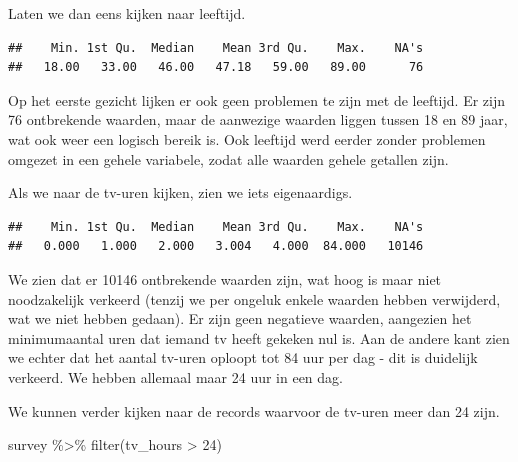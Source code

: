 \documentclass[]{tufte-book}
\newenvironment{Shaded}{}{}
\newcommand{\DecValTok}[1]{\textcolor[rgb]{0.25,0.63,0.44}{#1}}
\newcommand{\FunctionTok}[1]{\textcolor[rgb]{0.02,0.16,0.49}{#1}}
\newcommand{\NormalTok}[1]{#1}
\newcommand{\SpecialCharTok}[1]{\textcolor[rgb]{0.25,0.44,0.63}{#1}}
\begin{document}
Laten we dan eens kijken naar leeftijd.

\begin{Shaded}
\end{Shaded}

\begin{verbatim}
##    Min. 1st Qu.  Median    Mean 3rd Qu.    Max.    NA's 
##   18.00   33.00   46.00   47.18   59.00   89.00      76
\end{verbatim}

Op het eerste gezicht lijken er ook geen problemen te zijn met de leeftijd. Er zijn 76 ontbrekende waarden, maar de aanwezige waarden liggen tussen 18 en 89 jaar, wat ook weer een logisch bereik is. Ook leeftijd werd eerder zonder problemen omgezet in een gehele variabele, zodat alle waarden gehele getallen zijn.

Als we naar de tv-uren kijken, zien we iets eigenaardigs.

\begin{Shaded}
\end{Shaded}

\begin{verbatim}
##    Min. 1st Qu.  Median    Mean 3rd Qu.    Max.    NA's 
##   0.000   1.000   2.000   3.004   4.000  84.000   10146
\end{verbatim}

We zien dat er 10146 ontbrekende waarden zijn, wat hoog is maar niet noodzakelijk verkeerd (tenzij we per ongeluk enkele waarden hebben verwijderd, wat we niet hebben gedaan). Er zijn geen negatieve waarden, aangezien het minimumaantal uren dat iemand tv heeft gekeken nul is. Aan de andere kant zien we echter dat het aantal tv-uren oploopt tot 84 uur per dag - dit is duidelijk verkeerd. We hebben allemaal maar 24 uur in een dag.

We kunnen verder kijken naar de records waarvoor de tv-uren meer dan 24 zijn.

\begin{Shaded}
\begin{Highlighting}[]
\NormalTok{survey }\SpecialCharTok{\%\textgreater{}\%}
  \FunctionTok{filter}\NormalTok{(tv\_hours }\SpecialCharTok{\textgreater{}} \DecValTok{24}\NormalTok{)}
\end{Highlighting}
\end{Shaded}
\end{document}
